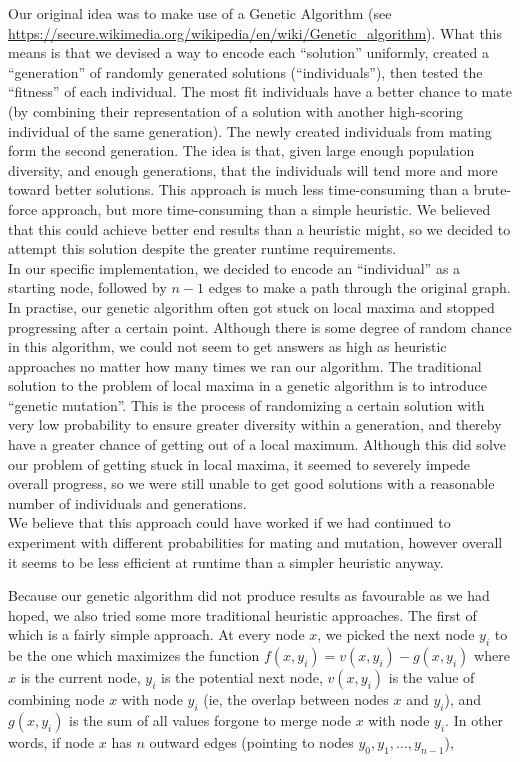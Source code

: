\documentclass{article}
\newcommand{\geneticwikiurl}{\url{https://secure.wikimedia.org/wikipedia/en/wiki/Genetic_algorithm}}
\begin{document}
Our original idea was to make use of a Genetic Algorithm (see \geneticwikiurl). What this means is that we devised a way to encode each ``solution'' uniformly, created a ``generation'' of randomly generated solutions (``individuals''), then tested the ``fitness'' of each individual. The most fit individuals have a better chance to mate (by combining their representation of a solution with another high-scoring individual of the same generation). The newly created individuals from mating form the second generation. The idea is that, given large enough population diversity, and enough generations, that the individuals will tend more and more toward better solutions. This approach is much less time-consuming than a brute-force approach, but more time-consuming than a simple heuristic. We believed that this could achieve better end results than a heuristic might, so we decided to attempt this solution despite the greater runtime requirements. \\

In our specific implementation, we decided to encode an ``individual'' as a starting node, followed by \( n - 1 \) edges to make a path through the original graph. \\

In practise, our genetic algorithm often got stuck on local maxima and stopped progressing after a certain point. Although there is some degree of random chance in this algorithm, we could not seem to get answers as high as heuristic approaches no matter how many times we ran our algorithm. The traditional solution to the problem of local maxima in a genetic algorithm is to introduce ``genetic mutation''. This is the process of randomizing a certain solution with very low probability to ensure greater diversity within a generation, and thereby have a greater chance of getting out of a local maximum. Although this did solve our problem of getting stuck in local maxima, it seemed to severely impede overall progress, so we were still unable to get good solutions with a reasonable number of individuals and generations. \\

We believe that this approach could have worked if we had continued to experiment with different probabilities for mating and mutation, however overall it seems to be less efficient at runtime than a simpler heuristic anyway.

Because our genetic algorithm did not produce results as favourable as we had hoped, we also tried some more traditional heuristic approaches. The first of which is a fairly simple approach. At every node \( x \), we picked the next node \( y_{i} \) to be the one which maximizes the function \( f \left( x, y_{i} \right) = v \left( x, y_{i} \right) - g \left( x, y_{i} \right) \) where \( x \) is the current node, \( y_{i} \) is the potential next node, \( v \left( x, y_{i} \right) \) is the value of combining node \( x \) with node \( y_{i} \) (ie, the overlap between nodes \( x \) and \( y_{i} \)), and \( g \left( x, y_{i} \right) \) is the sum of all values forgone to merge node \( x \) with node \( y_{i} \). In other words, if node \( x \) has \( n \) outward edges (pointing to nodes \( y_{0}, y_{1}, \ldots, y_{n - 1} \)),
\end{document}
